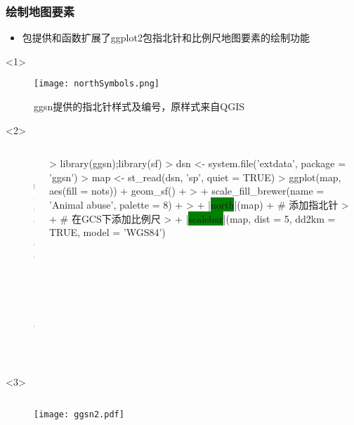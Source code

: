 \subsubsection{绘制地图要素}
\begin{frame}[t,fragile]{\subsecname}{\subsubsecname}
\begin{itemize} 
\item<1-> 包提供和函数扩展了ggplot2包指北针和比例尺地图要素的绘制功能
\end{itemize}

\begin{overlayarea}{\textwidth}{\textheight}
\begin{onlyenv}<1>
\begin{figure}[ht]
  \centering 
  \texttt{[image: northSymbols.png]}
  \caption{ggsn提供的指北针样式及编号，原样式来自QGIS}
\end{figure}
\end{onlyenv}

\begin{onlyenv}<2>
\begin{columns} 
\begin{column}{.4\textwidth}
\begin{figure}[ht] 
  \centering 
  \texttt{[image: ggsn1.pdf]}
\end{figure}
\end{column}

\begin{column}{.6\textwidth}
\centering
\begin{rcode}
> library(ggsn);library(sf)
> dsn <- system.file('extdata', package = 'ggsn')
> map <- st_read(dsn, 'sp', quiet = TRUE)
> ggplot(map, aes(fill = nots)) + geom_sf() +
> +    scale_fill_brewer(name = 'Animal abuse\nnotifications', palette = 8) +
> +    |\colorbox{green}{north}|(map) + # 添加指北针
> +     # 在GCS下添加比例尺
> +    |\colorbox{green}{scalebar}|(map, dist = 5, dd2km = TRUE, model = 'WGS84') 
\end{rcode}
\end{column}
\end{columns}
\end{onlyenv}

\begin{onlyenv}<3>
\begin{columns} 
\begin{column}{.4\textwidth}
\begin{figure}[ht] 
  \centering 
  \texttt{[image: ggsn2.pdf]}
\end{figure}
\end{column}


\end{columns}
\end{onlyenv}
\end{overlayarea}
\end{frame}
